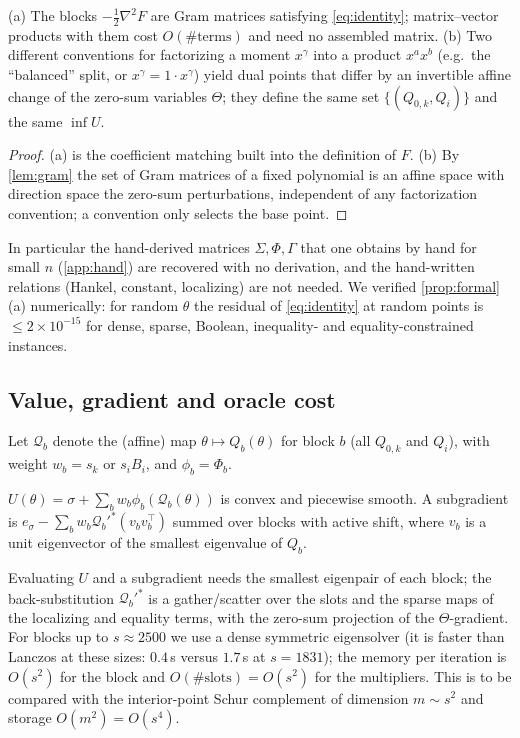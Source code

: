 \documentclass[a4paper,11pt]{article}
\theoremstyle{plain}
\theoremstyle{definition}
\theoremstyle{remark}
\begin{document}
\begin{proposition}\label{prop:formal}
(a) The blocks $-\frac12\nabla^2F$ are Gram matrices satisfying \eqref{eq:identity}; matrix--vector products with them cost $O(\#\text{terms})$ and need no assembled matrix.
(b) Two different conventions for factorizing a moment $x^\gamma$ into a product $x^ax^b$ (e.g.\ the ``balanced'' split, or $x^\gamma=1\cdot x^\gamma$) yield dual points that differ by an invertible affine change of the zero-sum variables $\Theta$; they define the same set $\{(Q_{0,k},Q_i)\}$ and the same $\inf U$.
\end{proposition}
\begin{proof}
(a) is the coefficient matching built into the definition of $F$. (b) By \cref{lem:gram} the set of Gram matrices of a fixed polynomial is an affine space with direction space the zero-sum perturbations, independent of any factorization convention; a convention only selects the base point.
\end{proof}
In particular the hand-derived matrices $\Sigma,\Phi,\Gamma$ that one obtains by hand for small $n$ (\cref{app:hand}) are recovered with no derivation, and the hand-written relations (Hankel, constant, localizing) are not needed. We verified \cref{prop:formal}(a) numerically: for random $\theta$ the residual of \eqref{eq:identity} at random points is $\le2\times10^{-15}$ for dense, sparse, Boolean, inequality- and equality-constrained instances.

\subsection{Value, gradient and oracle cost}
Let $\mathcal Q_b$ denote the (affine) map $\theta\mapsto Q_b(\theta)$ for block $b$ (all $Q_{0,k}$ and $Q_i$), with weight $w_b=s_k$ or $s_iB_i$, and $\phi_b=\Phi_b$.
\begin{proposition}[structure of $U$]\label{prop:structure}
$U(\theta)=\sigma+\sum_bw_b\phi_b(\mathcal Q_b(\theta))$ is convex and piecewise smooth. A subgradient is $e_\sigma-\sum_bw_b\mathcal Q_b'^{*}(v_bv_b^\top)$ summed over blocks with active shift, where $v_b$ is a unit eigenvector of the smallest eigenvalue of $Q_b$.
\end{proposition}
Evaluating $U$ and a subgradient needs the smallest eigenpair of each block; the back-substitution $\mathcal Q_b'^{*}$ is a gather/scatter over the slots and the sparse maps of the localizing and equality terms, with the zero-sum projection of the $\Theta$-gradient. For blocks up to $s\approx2500$ we use a dense symmetric eigensolver (it is faster than Lanczos at these sizes: $0.4$\,s versus $1.7$\,s at $s=1831$); the memory per iteration is $O(s^2)$ for the block and $O(\#\text{slots})=O(s^2)$ for the multipliers. This is to be compared with the interior-point Schur complement of dimension $m\sim s^2$ and storage $O(m^2)=O(s^4)$.
\end{document}
